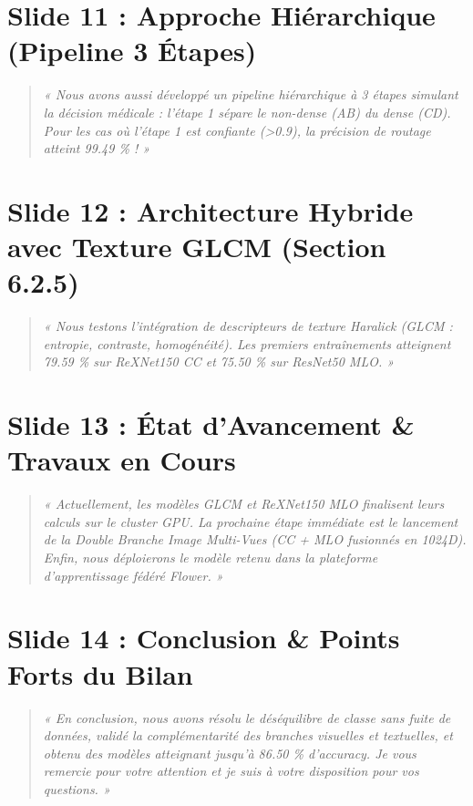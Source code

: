\documentclass[11pt, a4paper]{article}
\begin{document}
\section{Slide 11 : Approche Hiérarchique (Pipeline 3 Étapes)}
\begin{quote}
    \textit{« Nous avons aussi développé un pipeline hiérarchique à 3 étapes simulant la décision médicale : l'étape 1 sépare le non-dense (AB) du dense (CD). Pour les cas où l'étape 1 est confiante (>0.9), la précision de routage atteint 99.49 \% ! »}
\end{quote}

\section{Slide 12 : Architecture Hybride avec Texture GLCM (Section 6.2.5)}
\begin{quote}
    \textit{« Nous testons l'intégration de descripteurs de texture Haralick (GLCM : entropie, contraste, homogénéité). Les premiers entraînements atteignent 79.59 \% sur ReXNet150 CC et 75.50 \% sur ResNet50 MLO. »}
\end{quote}

\section{Slide 13 : État d'Avancement \& Travaux en Cours}
\begin{quote}
    \textit{« Actuellement, les modèles GLCM et ReXNet150 MLO finalisent leurs calculs sur le cluster GPU. La prochaine étape immédiate est le lancement de la Double Branche Image Multi-Vues (CC + MLO fusionnés en 1024D). Enfin, nous déploierons le modèle retenu dans la plateforme d'apprentissage fédéré Flower. »}
\end{quote}

\section{Slide 14 : Conclusion \& Points Forts du Bilan}
\begin{quote}
    \textit{« En conclusion, nous avons résolu le déséquilibre de classe sans fuite de données, validé la complémentarité des branches visuelles et textuelles, et obtenu des modèles atteignant jusqu'à 86.50 \% d'accuracy. Je vous remercie pour votre attention et je suis à votre disposition pour vos questions. »}
\end{quote}
\end{document}
